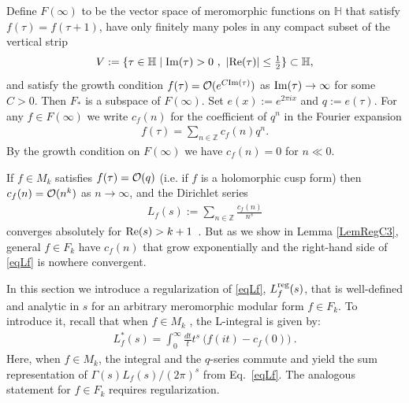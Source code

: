 \documentclass[11pt,a4paper]{article}
\newcommand{\G}{\Gamma}
\def\Z{\mathbb{Z}}
\newcommand{\HH}{{\mathbb H}}				%
\newcommand{\reg}{{\rm reg}}
\begin{document}
Define $F(\infty)$ to be the vector space of meromorphic functions on $\HH$ that satisfy $f(\tau)=f(\tau+1)$, have only finitely many poles in any compact subset of the vertical strip 
\begin{align}
V:= \{\tau\in \HH\mid {\rm Im}(\tau) > 0~,~|{\rm Re}(\tau)| \leq \tfrac12\} \subset \HH,
\end{align} 
and satisfy the growth condition $f(\tau)={\cal O}(e^{C{\rm Im}(\tau)})$ as ${\rm Im}(\tau)\to \infty$ for some $C>0$. Then $F_*$ is a subspace of $F(\infty)$. Set $e(x):=e^{2\pi i x}$ and $q:=e(\tau)$. For any $f\in F(\infty)$ we write $c_f(n)$ for the coefficient of $q^n$ in the Fourier expansion 
\begin{align}\label{eqCfn}
	f(\tau)=\sum_{n\in\Z}c_f(n)q^n.
\end{align}
By the growth condition on $F(\infty)$ we have $c_f(n)=0$ for $n\ll 0$. 

If $f\in M_k$ satisfies $f(\tau)={\cal O}(q)$ (i.e. if $f$ is a holomorphic cusp form) then $c_f(n)={\cal O}(n^k)$ as $n\to \infty$, and the Dirichlet series 
\begin{align}
L_f(s):=\sum_{n\in\Z}\frac{c_f(n)}{n^s} \label{eqLf}
\end{align}
converges absolutely for ${\rm Re}(s)>k+1$~\cite{01-Apostol}. But as we show in Lemma \ref{LemRegC3}, general $f\in F_k$ have $c_f(n)$ that grow exponentially and the right-hand side of \eqref{eqLf} is nowhere convergent. 

In this section we introduce a regularization of \eqref{eqLf}, $L_f^\reg(s)$, that is well-defined and analytic in $s$ for an arbitrary meromorphic modular form $f\in F_k$. To introduce it, recall that when $f \in M_k$ , the L-integral is given by:
\begin{align}
L_f^*(s) = \int_{0}^{\infty} \frac{dt}{t} t^s ~\big(f(it) - c_f(0)\big)~.
\label{eqLint0}
\end{align}
Here, when $f \in M_k$, the integral and the $q$-series commute and yield the sum representation of $\G(s) L_f(s)/(2\pi)^s$ from Eq.~\eqref{eqLf}. The analogous statement for $f \in F_k$ requires regularization.
\end{document}
